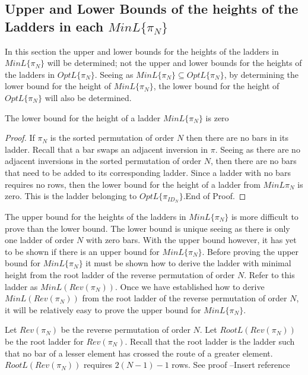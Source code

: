 \subsection{Upper and Lower Bounds of the heights of the Ladders in each $MinL\{\pi_{N}\}$}
In this section the upper and lower bounds for the heights of the ladders in $MinL\{\pi_{N}\}$ will be determined;
not the upper and lower bounds for the heights of the ladders in $OptL\{\pi_{N}\}$. Seeing as $MinL\{\pi_{N}\}\subseteq OptL\{\pi_{N}\}$, 
by determining the lower bound for the height of $MinL\{\pi_{N}\}$, the lower bound for the height of $OptL\{\pi_{N}\}$ will also be determined. 
\begin{lemma}
    The lower bound for the height of a ladder $MinL\{\pi_{N}\}$ is zero
\end{lemma} 
\begin{proof}
    If $\pi_{N}$ is the sorted permutation of order $N$ then there are no 
    bars in its ladder. Recall that a bar swaps an adjacent inversion in $\pi$.
    Seeing as there are no adjacent inversions in the sorted permutation of 
    order $N$, then there are no bars that need to be added to its corresponding 
    ladder. Since a ladder with no bars requires no rows, then the lower 
    bound for the height of a ladder from $MinL{\pi_{N}}$ is zero. This is 
    the ladder belonging to $OptL\{\pi_{ID_{N}}\}$.End of Proof.
\end{proof}\par 
The upper bound for the heights of the ladders in $MinL\{\pi_{N}\}$ is more difficult to prove than the lower bound. 
The lower bound is unique seeing as there is only one ladder of order $N$ with zero bars. 
With the upper bound however, it has yet to be shown if there is an upper bound for 
$MinL\{\pi_{N}\}$. Before proving the upper bound for $MinL\{\pi_{N}\}$ it must be shown how to 
derive the ladder with minimal height from the root ladder of the reverse permutation of order $N$.
Refer to this ladder as $MinL(Rev(\pi_{N}))$.
Once we have established how to derive $MinL(Rev(\pi_{N}))$ from the root ladder 
of the reverse permutation of order $N$, it will be relatively easy to prove the upper bound 
for $MinL\{\pi_{N}\}$.\par 
 Let $Rev(\pi_{N})$ be the reverse permutation of order 
 $N$.
 Let $RootL(Rev(\pi_{N}))$ be the root ladder for $Rev(\pi_{N})$. Recall that the root ladder is the ladder such 
    that no bar of a lesser element has crossed the route of a greater element. $RootL(Rev(\pi_{N}))$ requires 
    $2(N-1)-1$ rows. See proof --Insert reference\par 
   

